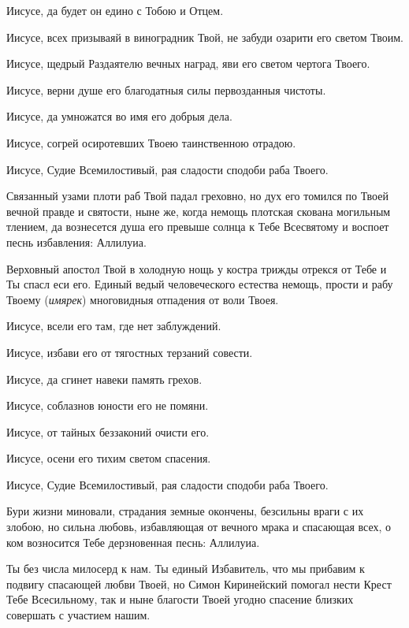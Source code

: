 \begin{mymulticols}
Иисусе, да будет он едино с Тобою и Отцем. 

Иисусе, всех призываяй в виноградник Твой, не забуди озарити его светом Твоим. 

Иисусе, щедрый Раздаятелю вечных наград, яви его светом чертога Твоего. 

Иисусе, верни душе его благодатныя силы первозданныя чистоты. 

Иисусе, да умножатся во имя его добрыя дела. 

Иисусе, согрей осиротевших Твоею таинственною отрадою. 

Иисусе, Судие Всемилостивый, рая сладости сподоби раба Твоего.




Связанный узами плоти раб Твой падал греховно, но дух его томился по Твоей вечной правде и святости, ныне же, когда немощь плотская скована могильным тлением, да вознесется душа его превыше солнца к Тебе Всесвятому и воспоет песнь избавления: Аллилуиа.




Верховный апостол Твой в холодную нощь у костра трижды отрекся от Тебе и Ты спасл еси его. Единый ведый человеческого естества немощь, прости и рабу Твоему ({\itshape имярек}) многовидныя отпадения от воли Твоея. 

Иисусе, всели его там, где нет заблуждений. 

Иисусе, избави его от тягостных терзаний совести. 

Иисусе, да сгинет навеки память грехов. 

Иисусе, соблазнов юности его не помяни. 

Иисусе, от тайных беззаконий очисти его. 

Иисусе, осени его тихим светом спасения. 

Иисусе, Судие Всемилостивый, рая сладости сподоби раба Твоего.




Бури жизни миновали, страдания земные окончены, безсильны враги с их злобою, но сильна любовь, избавляющая от вечного мрака и спасающая всех, о ком возносится Тебе дерзновенная песнь: Аллилуиа.




Ты без числа милосерд к нам. Ты единый Избавитель, что мы прибавим к подвигу спасающей любви Твоей, но Симон Киринейский помогал нести Крест Тебе Всесильному, так и ныне благости Твоей угодно спасение близких совершать с участием нашим. 


\end{mymulticols}
